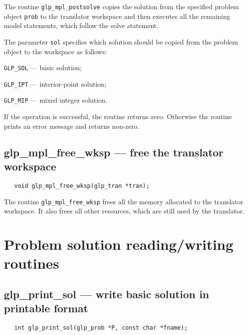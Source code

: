 \description

The routine \verb|glp_mpl_postsolve| copies the solution from the
specified problem object \verb|prob| to the translator workspace and
then executes all the remaining model statements, which follow the
solve statement.

The parameter \verb|sol| specifies which solution should be copied
from the problem object to the workspace as follows:

\verb|GLP_SOL| --- basic solution;

\verb|GLP_IPT| --- interior-point solution;

\verb|GLP_MIP| --- mixed integer solution.

\returns

If the operation is successful, the routine returns zero. Otherwise
the routine prints an error message and returns non-zero.

\subsection{glp\_mpl\_free\_wksp --- free the translator workspace}

\synopsis

\begin{verbatim}
   void glp_mpl_free_wksp(glp_tran *tran);
\end{verbatim}

\description

The routine \verb|glp_mpl_free_wksp| frees all the memory allocated to
the translator workspace. It also frees all other resources, which are
still used by the translator.


\newpage

\section{Problem solution reading/writing routines}

\subsection{glp\_print\_sol --- write basic solution in printable
format}

\synopsis

\begin{verbatim}
   int glp_print_sol(glp_prob *P, const char *fname);
\end{verbatim}

